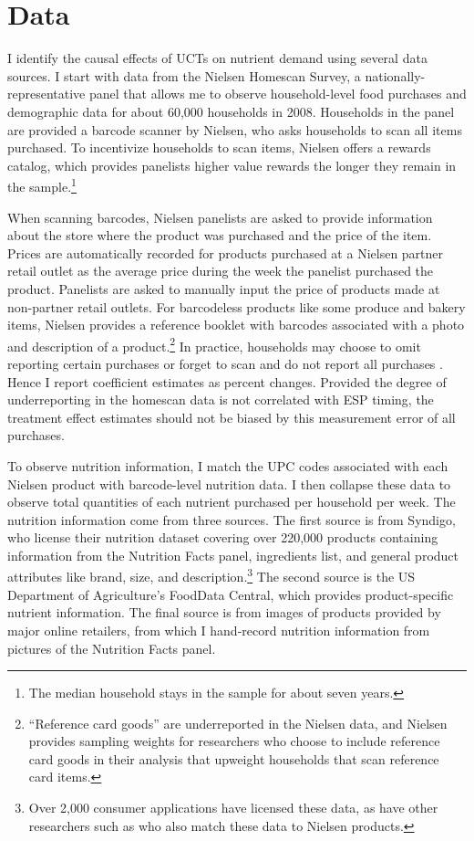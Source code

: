 \documentclass[12pt]{article}
\begin{document}
\section{Data} \label{data}

I identify the causal effects of UCTs on nutrient demand using several data sources.
I start with data from the Nielsen Homescan Survey, a nationally-representative panel that allows me to observe household-level food purchases and demographic data for about 60,000 households in 2008.
Households in the panel are provided a barcode scanner by Nielsen, who asks households to scan all items purchased.
To incentivize households to scan items, Nielsen offers a rewards catalog, which provides panelists higher value rewards the longer they remain in the sample.\footnote{The median household stays in the sample for about seven years.}

When scanning barcodes, Nielsen panelists are asked to provide information about the store where the product was purchased and the price of the item.
Prices are automatically recorded for products purchased at a Nielsen partner retail outlet as the average price during the week the panelist purchased the product.
Panelists are asked to manually input the price of products made at non-partner retail outlets.
For barcodeless products like some produce and bakery items, Nielsen provides a reference booklet with barcodes associated with a photo and description of a product.\footnote{``Reference card goods'' are underreported in the Nielsen data, and Nielsen provides sampling weights for researchers who choose to include reference card goods in their analysis that upweight households that scan reference card items.} In practice, households may choose to omit reporting certain purchases or forget to scan and do not report all purchases \parencite{einav2010recording}.
Hence I report coefficient estimates as percent changes.
Provided the degree of underreporting in the homescan data is not correlated with ESP timing, the treatment effect estimates should not be biased by this measurement error of all purchases.

To observe nutrition information, I match the UPC codes associated with each Nielsen product with barcode-level nutrition data.
I then collapse these data to observe total quantities of each nutrient purchased per household per week.
The nutrition information come from three sources.
The first source is from Syndigo, who license their nutrition dataset covering over 220,000 products containing information from the Nutrition Facts panel, ingredients list, and general product attributes like brand, size, and description.\footnote{Over 2,000 consumer applications have licensed these data, as have other researchers such as \textcite{dubois2014prices} who also match these data to Nielsen products.} The second source is the US Department of Agriculture's FoodData Central, which provides product-specific nutrient information.
The final source is from images of products provided by major online retailers, from which I hand-record nutrition information from pictures of the Nutrition Facts panel.
\end{document}
